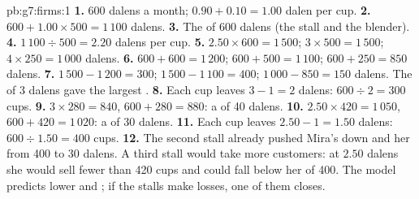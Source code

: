 \begin{solution}{pb:g7:firms:1}
\textbf{1.}  600 dalens a month;  $0.90 + 0.10 = 1.00$ dalen per cup.
\textbf{2.} $600 + 1.00 \times 500 = 1\,100$ dalens.
\textbf{3.} The  of 600 dalens (the stall and the blender).
\textbf{4.} $1\,100 \div 500 = 2.20$ dalens per cup.
\textbf{5.} $2.50 \times 600 = 1\,500$; $3 \times 500 = 1\,500$; $4 \times 250 = 1\,000$ dalens.
\textbf{6.} $600 + 600 = 1\,200$; $600 + 500 = 1\,100$; $600 + 250 = 850$ dalens.
\textbf{7.} $1\,500 - 1\,200 = 300$; $1\,500 - 1\,100 = 400$; $1\,000 - 850 = 150$ dalens. The 
of 3 dalens gave the largest .
\textbf{8.} Each cup leaves $3 - 1 = 2$ dalens: $600 \div 2 = 300$ cups.
\textbf{9.}  $3 \times 280 = 840$,  $600 + 280 = 880$: a  of 40 dalens.
\textbf{10.}  $2.50 \times 420 = 1\,050$,  $600 + 420 = 1\,020$: a  of 30
dalens.
\textbf{11.} Each cup leaves $2.50 - 1 = 1.50$ dalens: $600 \div 1.50 = 400$ cups.
\textbf{12.} The second stall already pushed Mira's  down and her  from 400 to 30 dalens.
A third stall would take more customers: at $2.50$ dalens she would sell fewer than 420 cups and
could fall below her  of 400. The model predicts lower  and ; if
the stalls make losses, one of them closes.
\end{solution}
